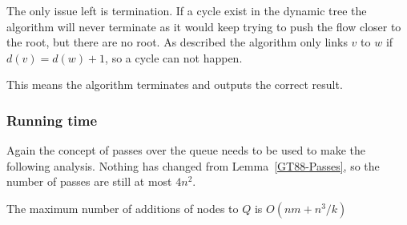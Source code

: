 The only issue left is termination. If a cycle exist in the dynamic tree the algorithm will never terminate as it would keep trying to push
the flow closer to the root, but there are no root. As described the algorithm only links $v$ to $w$ if $d(v) = d(w) + 1$, so a cycle can not happen. 

This means the algorithm terminates and outputs the correct result.

\subsubsection{Running time}
Again the concept of passes over the queue needs to be used to make the following analysis. Nothing has changed from Lemma~\ref{GT88-Passes}, so
the number of passes are still at most $4n^2$.
\begin{lemma} \label{GT88-DynamicAdditions}
The maximum number of additions of nodes to $Q$ is $O(nm+n^3/k)$
\end{lemma}
